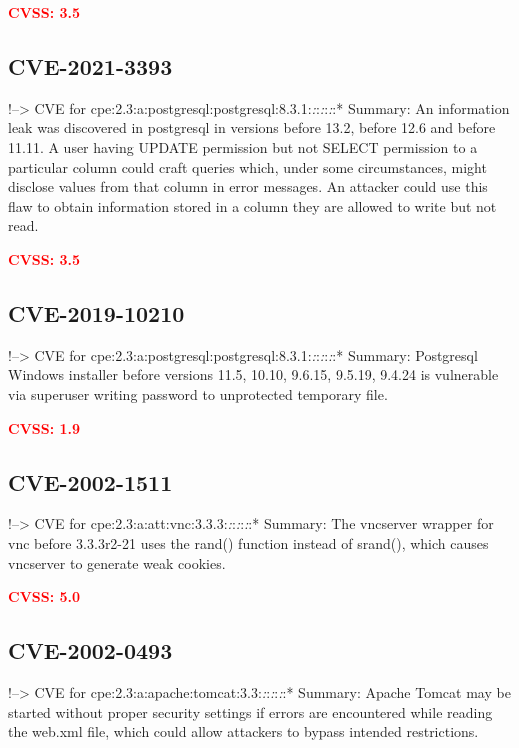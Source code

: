 \documentclass[a4paper, 12pt]{article}
\begin{document}
\textbf{\textcolor{red}{CVSS: 3.5}}

\hypertarget{cve-2021-3393}{%
\subsection{CVE-2021-3393}\label{cve-2021-3393}}

!--\textgreater{} CVE for
cpe:2.3:a:postgresql:postgresql:8.3.1:\emph{:}:\emph{:}:\emph{:}:*
Summary: An information leak was discovered in postgresql in versions
before 13.2, before 12.6 and before 11.11. A user having UPDATE
permission but not SELECT permission to a particular column could craft
queries which, under some circumstances, might disclose values from that
column in error messages. An attacker could use this flaw to obtain
information stored in a column they are allowed to write but not read.

\textbf{\textcolor{red}{CVSS: 3.5}}

\hypertarget{cve-2019-10210}{%
\subsection{CVE-2019-10210}\label{cve-2019-10210}}

!--\textgreater{} CVE for
cpe:2.3:a:postgresql:postgresql:8.3.1:\emph{:}:\emph{:}:\emph{:}:*
Summary: Postgresql Windows installer before versions 11.5, 10.10,
9.6.15, 9.5.19, 9.4.24 is vulnerable via superuser writing password to
unprotected temporary file.

\textbf{\textcolor{red}{CVSS: 1.9}}

\hypertarget{cve-2002-1511}{%
\subsection{CVE-2002-1511}\label{cve-2002-1511}}

!--\textgreater{} CVE for
cpe:2.3:a:att:vnc:3.3.3:\emph{:}:\emph{:}:\emph{:}:* Summary: The
vncserver wrapper for vnc before 3.3.3r2-21 uses the rand() function
instead of srand(), which causes vncserver to generate weak cookies.

\textbf{\textcolor{red}{CVSS: 5.0}}

\hypertarget{cve-2002-0493}{%
\subsection{CVE-2002-0493}\label{cve-2002-0493}}

!--\textgreater{} CVE for
cpe:2.3:a:apache:tomcat:3.3:\emph{:}:\emph{:}:\emph{:}:* Summary: Apache
Tomcat may be started without proper security settings if errors are
encountered while reading the web.xml file, which could allow attackers
to bypass intended restrictions.
\end{document}
